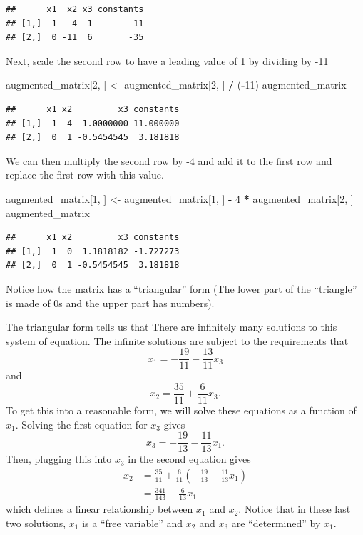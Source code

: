 \documentclass[
]{book}
\newenvironment{Shaded}{\begin{snugshade}}{\end{snugshade}}
\newcommand{\DecValTok}[1]{\textcolor[rgb]{0.00,0.00,0.81}{#1}}
\newcommand{\NormalTok}[1]{#1}
\newcommand{\OperatorTok}[1]{\textcolor[rgb]{0.81,0.36,0.00}{\textbf{#1}}}
\newcommand{\StringTok}[1]{\textcolor[rgb]{0.31,0.60,0.02}{#1}}
\theoremstyle{definition}
\theoremstyle{definition}
\theoremstyle{definition}
\theoremstyle{remark}
\begin{document}
\begin{verbatim}
##      x1  x2 x3 constants
## [1,]  1   4 -1        11
## [2,]  0 -11  6       -35
\end{verbatim}

Next, scale the second row to have a leading value of 1 by dividing by -11

\begin{Shaded}
\begin{Highlighting}[]
\NormalTok{augmented_matrix[}\DecValTok{2}\NormalTok{, ] <-}\StringTok{ }\NormalTok{augmented_matrix[}\DecValTok{2}\NormalTok{, ] }\OperatorTok{/}\StringTok{ }\NormalTok{(}\OperatorTok{-}\DecValTok{11}\NormalTok{)}
\NormalTok{augmented_matrix}
\end{Highlighting}
\end{Shaded}

\begin{verbatim}
##      x1 x2         x3 constants
## [1,]  1  4 -1.0000000 11.000000
## [2,]  0  1 -0.5454545  3.181818
\end{verbatim}

We can then multiply the second row by -4 and add it to the first row and replace the first row with this value.

\begin{Shaded}
\begin{Highlighting}[]
\NormalTok{augmented_matrix[}\DecValTok{1}\NormalTok{, ] <-}\StringTok{ }\NormalTok{augmented_matrix[}\DecValTok{1}\NormalTok{, ] }\OperatorTok{-}\StringTok{ }\DecValTok{4} \OperatorTok{*}\StringTok{ }\NormalTok{augmented_matrix[}\DecValTok{2}\NormalTok{, ]}
\NormalTok{augmented_matrix}
\end{Highlighting}
\end{Shaded}

\begin{verbatim}
##      x1 x2         x3 constants
## [1,]  1  0  1.1818182 -1.727273
## [2,]  0  1 -0.5454545  3.181818
\end{verbatim}

Notice how the matrix has a ``triangular'' form (The lower part of the ``triangle'' is made of 0s and the upper part has numbers).

The triangular form tells us that There are infinitely many solutions to this system of equation. The infinite solutions are subject to the requirements that
\[x_1 = - \frac{19}{11} - \frac{13}{11} x_3\]
and
\[x_2 = \frac{35}{11} + \frac{6}{11} x_3.\]
To get this into a reasonable form, we will solve these equations as a function of \(x_1\). Solving the first equation for \(x_3\) gives
\[x_3 = - \frac{19}{13} -\frac{11}{13} x_1.\]
Then, plugging this into \(x_3\) in the second equation gives
\[
\begin{aligned}
x_2 & = \frac{35}{11} + \frac{6}{11} \left( - \frac{19}{13} -\frac{11}{13} x_1 \right) \\
& = \frac{341}{143} - \frac{6}{13} x_1
\end{aligned}
\]
which defines a linear relationship between \(x_1\) and \(x_2\). Notice that in these last two solutions, \(x_1\) is a ``free variable'' and \(x_2\) and \(x_3\) are ``determined'' by \(x_1\).
\end{document}
